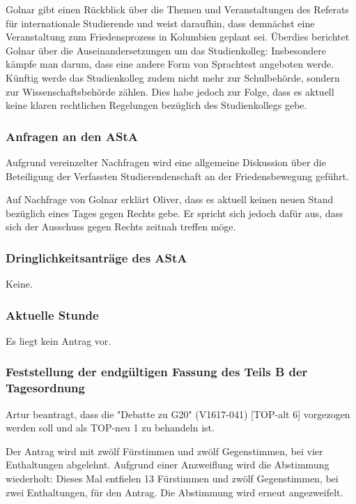 \documentclass[ngerman,headheight=70pt]{scrartcl}
\begin{document}
    Golnar gibt einen Rückblick über die Themen und Veranstaltungen des Referats
    für internationale Studierende und weist daraufhin, dass demnächst eine
    Veranstaltung zum Friedensprozess in Kolumbien geplant sei. Überdies berichtet
    Golnar über die Auseinandersetzungen um das Studienkolleg:  Insbesondere
    kämpfe man darum, dass eine andere Form von Sprachtest angeboten werde.
    Künftig werde das Studienkolleg zudem nicht mehr zur Schulbehörde, sondern
    zur Wissenschaftsbehörde zählen. Dies habe jedoch zur Folge, dass es aktuell
    keine klaren rechtlichen Regelungen bezüglich des Studienkollegs gebe.

    \subsubsection{Anfragen an den AStA}

    Aufgrund vereinzelter Nachfragen wird eine allgemeine Diskussion über die
    Beteiligung der Verfassten Studierendenschaft an der Friedensbewegung geführt.

    Auf Nachfrage von Golnar erklärt Oliver, dass es aktuell keinen neuen Stand
    bezüglich eines Tages gegen Rechts gebe. Er spricht sich jedoch dafür aus,
    dass sich der Ausschuss gegen Rechts zeitnah treffen möge.

    \subsubsection{Dringlichkeitsanträge des AStA}

    Keine.

    \subsubsection{Aktuelle Stunde}

    Es liegt kein Antrag vor.

    \subsubsection{Feststellung der endgültigen Fassung des Teils B der Tagesordnung}

    Artur beantragt, dass die "Debatte zu G20" (V1617-041) [TOP-alt 6] vorgezogen
    werden soll und als TOP-neu 1 zu behandeln ist.

    Der Antrag wird mit zwölf Fürstimmen und zwölf Gegenstimmen, bei vier
    Enthaltungen abgelehnt. Aufgrund einer Anzweiflung wird die Abstimmung
    wiederholt: Dieses Mal entfielen 13 Fürstimmen und zwölf Gegenstimmen, bei
    zwei Enthaltungen, für den Antrag. Die Abstimmung wird erneut angezweifelt.
\end{document}

